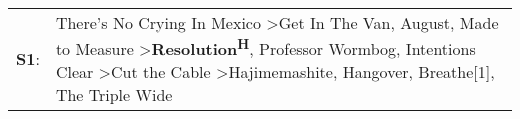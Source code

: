 \begin{supertabular}{p{0.03\textwidth}p{0.92\textwidth}}
 \textbf{S1}:  &  There's No Crying In Mexico\textsuperscript{} \textgreater \enspace Get In The Van\textsuperscript{}, \enspace August\textsuperscript{}, \enspace Made to Measure\textsuperscript{} \textgreater \enspace \textbf{Resolution\textsuperscript{H}}, \enspace Professor Wormbog\textsuperscript{}, \enspace Intentions Clear\textsuperscript{} \textgreater \enspace Cut the Cable\textsuperscript{} \textgreater \enspace Hajimemashite\textsuperscript{}, \enspace Hangover\textsuperscript{}, \enspace Breathe[1]\textsuperscript{}, \enspace The Triple Wide\textsuperscript{}  \enspace  \\
\end{supertabular}
